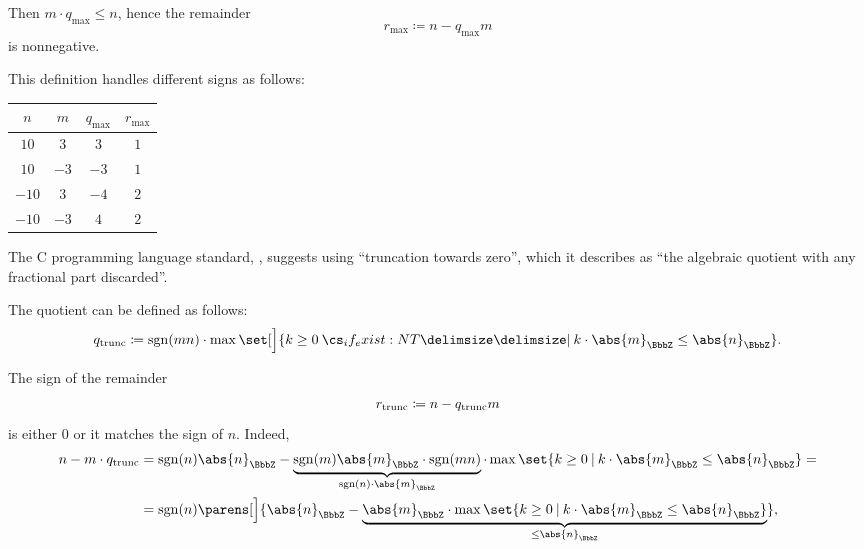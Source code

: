 \begin{remark}
\begin{thmenum}
    Then \( m \cdot q_{\max} \leq n \), hence the remainder
    \begin{equation*}
      r_{\max} \coloneqq n - q_{\max} m
    \end{equation*}
    is nonnegative.

    This definition handles different signs as follows:
    \begin{center}
      \begin{tabular}{c c c c}
        \( n \)   & \( m \)  & \( q_{\max} \) & \( r_{\max} \) \\
        \hline
        \( 10 \)  & \( 3 \)  & \( 3 \)        & \( 1 \) \\
        \( 10 \)  & \( -3 \) & \( -3 \)       & \( 1 \) \\
        \( -10 \) & \( 3 \)  & \( -4 \)       & \( 2 \) \\
        \( -10 \) & \( -3 \) & \( 4 \)        & \( 2 \)
      \end{tabular}
    \end{center}

     The C programming language standard, \cite[66]{ISO:9899:2018}, suggests using \enquote{truncation towards zero}, which it describes as \enquote{the algebraic quotient with any fractional part discarded}.

    The quotient can be defined as follows:
    \begin{equation}\label{eq:rem:integer_division_uniqueness/trunc/q}
      q_{\T{trunc}} \coloneqq \sgn(mn) \cdot \max\set[\Big]{ k \geq 0 \given* k \cdot \abs{m}_\BbbZ \leq \abs{n}_\BbbZ }.
    \end{equation}

    The sign of the remainder
    \begin{equation*}
      r_{\T{trunc}} \coloneqq n - q_{\T{trunc}} m
    \end{equation*}
    is either \( 0 \) or it matches the sign of \( n \). Indeed,
    \begin{align*}
      n - m \cdot q_{\T{trunc}}
      &=
      \sgn(n) \abs{n}_\BbbZ - \underbrace{\sgn(m) \abs{m}_\BbbZ \cdot \sgn(mn)}_{\sgn(n) \cdot \abs{m}_\BbbZ} \cdot \max\set{ k \geq 0 \given k \cdot \abs{m}_\BbbZ \leq \abs{n}_\BbbZ }
      = \\ &=
      \sgn(n) \parens[\Big]{ \abs{n}_\BbbZ - \underbrace{\abs{m}_\BbbZ \cdot \max\set{ k \geq 0 \given k \cdot \abs{m}_\BbbZ \leq \abs{n}_\BbbZ }}_{\leq \abs{n}_\BbbZ} },
    \end{align*}


\end{thmenum}
\end{remark}
